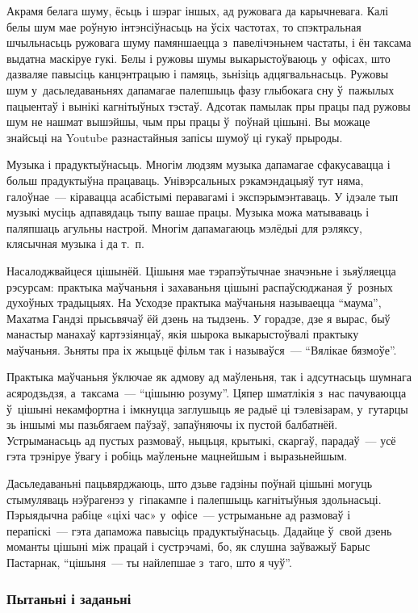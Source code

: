 Акрамя белага шуму, ёсьць і шэраг іншых, ад ружовага да карычневага. Калі белы шум мае роўную інтэнсіўнасьць на ўсіх частотах, то спэктральная шчыльнасьць ружовага шуму памяншаецца з~павелічэньнем частаты, і ён таксама выдатна маскіруе гукі. Белы і ружовы шумы выкарыстоўваюць у~офісах, што дазваляе павысіць канцэнтрацыю і памяць, зьнізіць адцягвальнасьць. Ружовы шум у~дасьледаваньнях дапамагае палепшыць фазу глыбокага сну ў~пажылых пацыентаў і вынікі кагнітыўных тэстаў. Адсотак памылак пры працы пад ружовы шум не нашмат вышэйшы, чым пры працы ў~поўнай цішыні. Вы можаце знайсьці на Youtube разнастайныя запісы шумоў ці гукаў прыроды.

Музыка і прадуктыўнасьць. Многім людзям музыка дапамагае сфакусавацца і больш прадуктыўна працаваць. Унівэрсальных рэкамэндацыяў тут няма, галоўнае~--- кіравацца асабістымі перавагамі і экспэрымэнтаваць. У ідэале тып музыкі мусіць адпавядаць тыпу вашае працы. Музыка можа матываваць і паляпшаць агульны настрой. Многім дапамагаюць мэлёдыі для рэляксу, клясычная музыка і да т.~п.

Насалоджвайцеся цішынёй. Цішыня мае тэрапэўтычнае значэньне і зьяўляецца рэсурсам: практыка маўчаньня і захаваньня цішыні распаўсюджаная ў~розных духоўных традыцыях. На Усходзе практыка маўчаньня называецца ``маума'', Махатма Гандзі прысьвячаў ёй дзень на тыдзень. У горадзе, дзе я вырас, быў манастыр манахаў картэзіянцаў, якія шырока выкарыстоўвалі практыку маўчаньня. Зьняты пра іх жыцьцё фільм так і называўся~--- ``Вялікае бязмоўе''.

Практыка маўчаньня ўключае як адмову ад маўленьня, так і адсутнасьць шумнага асяродзьдзя, а~таксама~--- ``цішыню розуму''. Цяпер шматлікія з~нас пачуваюцца ў~цішыні некамфортна і імкнуцца заглушыць яе радыё ці тэлевізарам, у~гутарцы зь іншымі мы пазьбягаем паўзаў, запаўняючы іх пустой балбатнёй. Устрыманасьць ад пустых размоваў, ныцьця, крытыкі, скаргаў, парадаў~--- усё гэта трэніруе ўвагу і робіць маўленьне мацнейшым і выразьнейшым.

Дасьледаваньні пацьвярджаюць, што дзьве гадзіны поўнай цішыні могуць стымуляваць нэўрагенэз у~гіпакампе і палепшыць кагнітыўныя здольнасьці. Пэрыядычна рабіце «ціхі час» у~офісе~--- устрыманьне ад размоваў і перапіскі~--- гэта дапаможа павысіць прадуктыўнасьць. Дадайце ў~свой дзень моманты цішыні між працай і сустрэчамі, бо, як слушна заўважыў Барыс Пастарнак, ``цішыня~--- ты найлепшае з~таго, што я чуў''.

\subsubsection{Пытаньні і заданьні}

